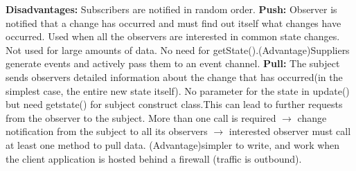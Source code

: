 \documentclass[letterpaper, 8pt]{extarticle}
\begin{document}
\begin{multicols*}{5}
  \textbf{Disadvantages:} Subscribers are notified in random order.
  \textbf{Push:} Observer is notified that a change has occurred and must find out itself what changes have occurred. Used when all the observers are interested in common state changes. Not used for large amounts of data. No need for getState().(Advantage)Suppliers generate events and actively pass them to an event channel. 
  \textbf{Pull:} The subject sends observers detailed information about the change that has occurred(in the simplest case, the entire new state itself). No parameter for the state in update() but need getstate() for subject construct class.This can lead to further requests from the observer to the subject. More than one call is required $\rightarrow$ change notification from the subject to all its observers $\rightarrow$ interested observer must call at least one method to pull data. (Advantage)simpler to write, and work when the client application is hosted behind a firewall (traffic is outbound). 


\end{multicols*}
\end{document}
